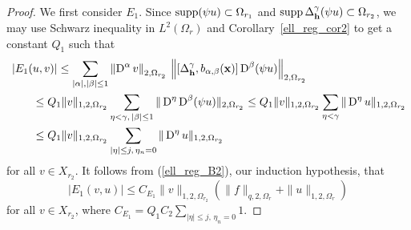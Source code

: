 \begin{proof}
We first consider $E_1$.  Since $\operatorname{supp} (\psi u) \subset \Omega_{r_1}$
and $\displaystyle \operatorname{supp} \Delta_{\mathbf{h}}^\gamma (\psi u) \subset \Omega_{r_2}$,
we may use Schwarz inequality in $\displaystyle L^2(\Omega_r)$ and
Corollary~\ref{ell_reg_cor2} to get a constant $Q_1$ such that
\begin{align*}
&\left| E_1(u,v) \right| \leq 
\sum_{|\alpha|,|\beta|\leq 1}
\left\| \operatorname{D}^\alpha v\right\|_{2,\Omega_{r_2}} \, \left\|[\Delta_{\mathbf{h}}^\gamma,
b_{\alpha,\beta}(\mathbf{x})] \operatorname{D}^\beta (\psi u) \right\|_{2,\Omega_{r_2}} \\
&\qquad \leq Q_1 \|v\|_{1,2,\Omega_{r_2}}
\sum_{\eta<\gamma,\, |\beta|\leq 1}
\| \operatorname{D}^\eta \operatorname{D}^\beta (\psi u) \|_{2,\Omega_{r_2}}
\leq Q_1 \|v\|_{1,2,\Omega_{r_2}}
\sum_{\eta<\gamma} \| \operatorname{D}^\eta u \|_{1,2,\Omega_{r_2}} \\
&\qquad \leq Q_1 \|v\|_{1,2,\Omega_{r_2}}
\sum_{|\eta|\leq j,\, \eta_n=0} \| \operatorname{D}^\eta u \|_{1,2,\Omega_{r_2}}
\end{align*}
for all $v \in X_{r_2}$.  It follows from (\ref{ell_reg_B2}), our
induction hypothesis, that
\[
\left| E_1(v,u) \right| \leq C_{E_1} \|v\|_{1,2,\Omega_{r_2}}
\left( \|f\|_{q,2,\Omega_r} + \|u\|_{1,2,\Omega_r} \right)
\]
for all $v \in X_{r_2}$, where
$\displaystyle C_{E_1} = Q_1 C_2 \sum_{|\eta|\leq j,\,\eta_n=0} 1$.


\end{proof}
